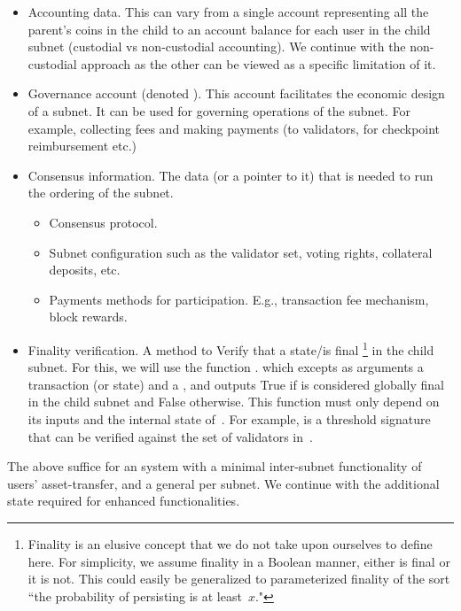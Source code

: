 \begin{itemize}
    \item Accounting data. This can vary from a single account representing all the parent's coins in the child to an account balance for each user in the child subnet (custodial vs non-custodial accounting). We continue with the non-custodial approach as the other can be viewed as a specific limitation of it.
    \item Governance account (denoted \gov). This account facilitates the economic design of a subnet. It can be used for governing operations of the subnet. For example, collecting fees and making payments (to validators, for checkpoint reimbursement etc.) 
    \item Consensus information. The data (or a pointer to it) that is needed to run the ordering of the subnet.
    \begin{itemize}
        \item Consensus protocol.
        \item Subnet configuration such as the validator set, voting rights, collateral deposits, etc.
        \item Payments methods for participation. E.g., transaction fee mechanism, block rewards.
    \end{itemize}
    \item Finality verification. A method to Verify that a state/\tx is final%
    \footnote{Finality is an elusive concept that we do not take upon ourselves to define here. For simplicity, we assume finality in a Boolean manner, either \tx is final or it is not. This could easily be generalized to parameterized finality of the sort ``the probability of \tx persisting is at least~$x$."}
    in the child subnet. For this, we will use the function \sa.\verifyGfinal{\tx}{\prf} which excepts as arguments a transaction (or state) and a \prf, and outputs True if \tx is considered globally final in the child subnet and False otherwise. This function must only depend on its inputs and the internal state of~\sa. For example, \prf is a threshold signature that can be verified against the set of validators in~\sa.
\end{itemize}
%
The above suffice for an \ipcFull system with a minimal inter-subnet functionality of users' asset-transfer, and a general \smr per subnet. We continue with the additional state required for enhanced functionalities.
